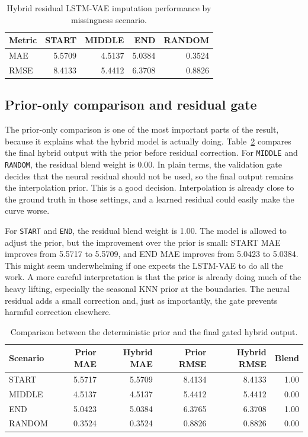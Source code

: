\begin{table}[ht]
	\centering
	\small
	\begin{tabular}{lrrrr}
		\toprule
		\textbf{Metric} & \textbf{START} & \textbf{MIDDLE} & \textbf{END} & \textbf{RANDOM} \\
		\midrule
		MAE & 5.5709 & 4.5137 & 5.0384 & 0.3524 \\
		RMSE & 8.4133 & 5.4412 & 6.3708 & 0.8826 \\
		\bottomrule
	\end{tabular}
	\caption{Hybrid residual LSTM-VAE imputation performance by missingness scenario.}
	\label{tab:hybrid-main-results}
\end{table}

\subsection{Prior-only comparison and residual gate}

The prior-only comparison is one of the most important parts of the result, because it explains what the hybrid model is actually doing. Table~\ref{tab:prior-gate-results} compares the final hybrid output with the prior before residual correction. For \texttt{MIDDLE} and \texttt{RANDOM}, the residual blend weight is 0.00. In plain terms, the validation gate decides that the neural residual should not be used, so the final output remains the interpolation prior. This is a good decision. Interpolation is already close to the ground truth in those settings, and a learned residual could easily make the curve worse.

For \texttt{START} and \texttt{END}, the residual blend weight is 1.00. The model is allowed to adjust the prior, but the improvement over the prior is small: START MAE improves from 5.5717 to 5.5709, and END MAE improves from 5.0423 to 5.0384. This might seem underwhelming if one expects the LSTM-VAE to do all the work. A more careful interpretation is that the prior is already doing much of the heavy lifting, especially the seasonal KNN prior at the boundaries. The neural residual adds a small correction and, just as importantly, the gate prevents harmful correction elsewhere.

\begin{table}[ht]
	\centering
	\small
	\begin{tabular}{lrrrrr}
		\toprule
		\textbf{Scenario} & \textbf{Prior MAE} & \textbf{Hybrid MAE} & \textbf{Prior RMSE} & \textbf{Hybrid RMSE} & \textbf{Blend} \\
		\midrule
		START & 5.5717 & 5.5709 & 8.4134 & 8.4133 & 1.00 \\
		MIDDLE & 4.5137 & 4.5137 & 5.4412 & 5.4412 & 0.00 \\
		END & 5.0423 & 5.0384 & 6.3765 & 6.3708 & 1.00 \\
		RANDOM & 0.3524 & 0.3524 & 0.8826 & 0.8826 & 0.00 \\
		\bottomrule
	\end{tabular}
	\caption{Comparison between the deterministic prior and the final gated hybrid output.}
	\label{tab:prior-gate-results}
\end{table}

